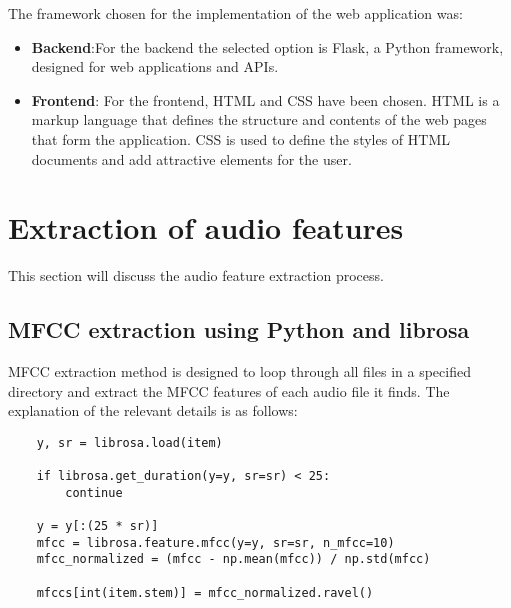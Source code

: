 The framework chosen for the implementation of the web application was:

\begin{itemize}

\item \textbf{Backend}:For the backend the selected option is Flask, a Python framework, designed for web applications and APIs.

\item \textbf{Frontend}: For the frontend, HTML and CSS have been chosen. HTML is a markup language that defines the structure and contents of the web pages that form the application. CSS is used to define the styles of HTML documents and add attractive elements for the user.

\end{itemize}

\newpage

\section{Extraction of audio features}

This section will discuss the audio feature extraction process.

\subsection{MFCC extraction using Python and librosa}

MFCC extraction method is designed to loop through all files in a specified directory and extract the MFCC features of each audio file it finds. The explanation of the relevant details is as follows:

\begin{verbatim}
	y, sr = librosa.load(item)

	if librosa.get_duration(y=y, sr=sr) < 25:
		continue

	y = y[:(25 * sr)]
	mfcc = librosa.feature.mfcc(y=y, sr=sr, n_mfcc=10)
	mfcc_normalized = (mfcc - np.mean(mfcc)) / np.std(mfcc)

	mfccs[int(item.stem)] = mfcc_normalized.ravel()
\end{verbatim}

